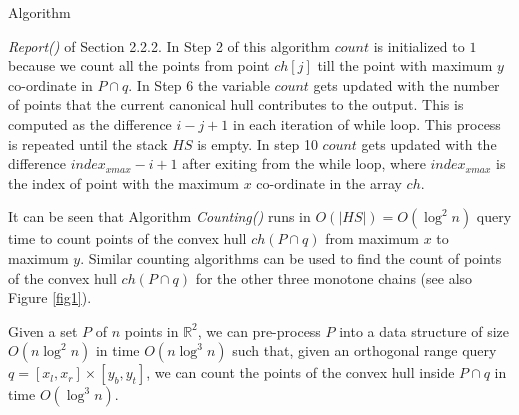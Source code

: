 \documentclass[runningheads,a4paper]{llncs}
\begin{document}
Algorithm {\emph{Report()} of Section 2.2.2. In
Step 2 of this algorithm $count$ is initialized to $1$ because we count all the
points from point $ch[j]$ till the point with maximum $y$ co-ordinate in $P \cap q$. In Step
6 the variable $count$ gets updated with the number of points that the current
canonical hull contributes to the output. This is computed as the difference
$i-j+1$ in each iteration of while loop. This process is repeated until the
stack $HS$ is empty.  In step 10 $count$ gets updated with the difference
$index_{xmax} - i + 1$ after exiting from the while loop, where $index_{xmax}$
is the index of point with the maximum $x$ co-ordinate in the array $ch$.

It can be seen that Algorithm \emph{Counting()} runs in $O(|HS|) =
O(\log^{2}n)$ query time to count points of the convex hull $ch(P \cap q)$
from maximum $x$ to maximum $y$. Similar counting algorithms can be used to
find the count of points of the convex hull $ch(P \cap q)$ for the other three
monotone chains (see also Figure \ref{fig1}).
\begin{theorem}
Given a set $P$ of $n$ points in $\mathbb{R}^{2}$, we can pre-process $P$
into a data structure of size $O(n \log^{2} n)$ in time $O(n \log^{3} n)$
such that, given an orthogonal range query $q = [x_{l}, x_{r}] \times
[y_{b}, y_{t}]$, we can count the points of the convex hull inside $P \cap
q$ in time $O(\log^{3} n)$.
\end{theorem}

}
\end{document}
